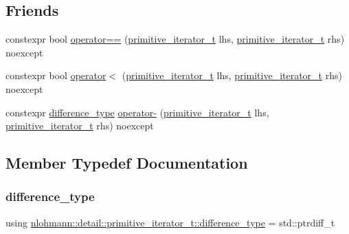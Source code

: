 \subsection*{Friends}
\begin{DoxyCompactItemize}
\item 
constexpr bool \mbox{\hyperlink{classnlohmann_1_1detail_1_1primitive__iterator__t_aae1e1e2ec0e229d1291d69de57d76bbe}{operator==}} (\mbox{\hyperlink{classnlohmann_1_1detail_1_1primitive__iterator__t}{primitive\+\_\+iterator\+\_\+t}} lhs, \mbox{\hyperlink{classnlohmann_1_1detail_1_1primitive__iterator__t}{primitive\+\_\+iterator\+\_\+t}} rhs) noexcept
\item 
constexpr bool \mbox{\hyperlink{classnlohmann_1_1detail_1_1primitive__iterator__t_a901a95e6d73c9509d3dcde914f6c8a9d}{operator$<$}} (\mbox{\hyperlink{classnlohmann_1_1detail_1_1primitive__iterator__t}{primitive\+\_\+iterator\+\_\+t}} lhs, \mbox{\hyperlink{classnlohmann_1_1detail_1_1primitive__iterator__t}{primitive\+\_\+iterator\+\_\+t}} rhs) noexcept
\item 
constexpr \mbox{\hyperlink{classnlohmann_1_1detail_1_1primitive__iterator__t_af3db0d5c90de427d51645fe73a015553}{difference\+\_\+type}} \mbox{\hyperlink{classnlohmann_1_1detail_1_1primitive__iterator__t_ac6d902d6ec9a02dabed5452d3ae78f7e}{operator-\/}} (\mbox{\hyperlink{classnlohmann_1_1detail_1_1primitive__iterator__t}{primitive\+\_\+iterator\+\_\+t}} lhs, \mbox{\hyperlink{classnlohmann_1_1detail_1_1primitive__iterator__t}{primitive\+\_\+iterator\+\_\+t}} rhs) noexcept
\end{DoxyCompactItemize}


\subsection{Member Typedef Documentation}
\mbox{\label{classnlohmann_1_1detail_1_1primitive__iterator__t_af3db0d5c90de427d51645fe73a015553}} 
\subsubsection{\texorpdfstring{difference\_type}{difference\_type}}
{\footnotesize\ttfamily using \mbox{\hyperlink{classnlohmann_1_1detail_1_1primitive__iterator__t_af3db0d5c90de427d51645fe73a015553}{nlohmann\+::detail\+::primitive\+\_\+iterator\+\_\+t\+::difference\+\_\+type}} =  std\+::ptrdiff\+\_\+t\hspace{0.3cm}{\ttfamily [private]}}



